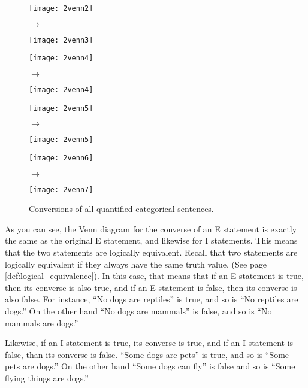 \begin{figure}[!ht]
\texttt{[image: 2venn2]}
\begin{minipage}[c]{0.1\textwidth}\vspace{-2.5cm}\hspace{.4cm}$\to$\end{minipage}
\texttt{[image: 2venn3]}


\texttt{[image: 2venn4]}
\begin{minipage}[c]{0.1\textwidth}\vspace{-2.5cm}\hspace{.4cm}$\to$\end{minipage}
\texttt{[image: 2venn4]}


\texttt{[image: 2venn5]}
\begin{minipage}[c]{0.1\textwidth}\vspace{-2.5cm}\hspace{.4cm}$\to$\end{minipage}
\texttt{[image: 2venn5]}


\texttt{[image: 2venn6]}
\begin{minipage}[c]{0.1\textwidth}\vspace{-2.5cm}\hspace{.4cm}$\to$\end{minipage}
\texttt{[image: 2venn7]}
\caption{Conversions of all quantified categorical sentences.}
\label{fig:conversion}
\end{figure}

As you can see, the Venn diagram for the converse of an E statement is exactly the same as the original E statement, and likewise for I statements. This means that the two statements are logically equivalent. Recall that two statements are logically equivalent if they always have the same truth value. (See page \ref{def:logical_equivalence}). In this case, that means that if an E statement is true, then its converse is also true, and if an E statement is false, then its converse is also false. For instance, ``No dogs are reptiles'' is true, and so is ``No reptiles are dogs.'' On the other hand ``No dogs are mammals'' is false, and so is ``No mammals are dogs.''

Likewise, if an I statement is true, its converse is true, and if an I statement is false, than its converse is false. ``Some dogs are pets'' is true, and so is ``Some pets are dogs.'' On the other hand ``Some dogs can fly'' is false and so is ``Some flying things are dogs.''

